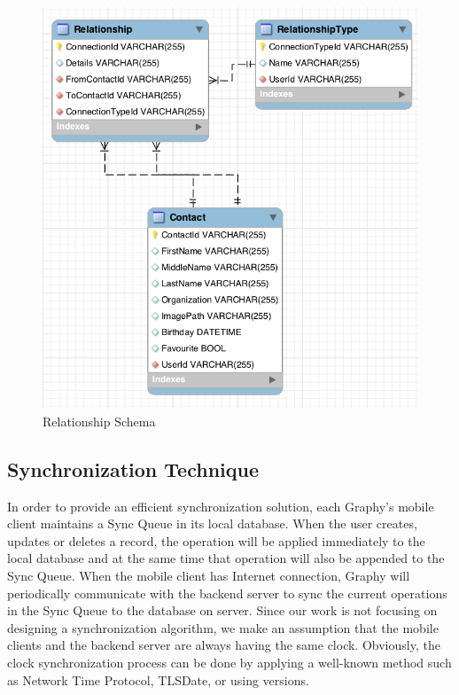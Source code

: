 \begin{figure}[!h]
\begin{centering}
\includegraphics[scale=0.5]{pics/dbrelationship}
\caption{Relationship Schema}\label{fg:dbrelationship}
\end{centering}
\end{figure}

\subsection{Synchronization Technique}
In order to provide an efficient synchronization solution, each Graphy's mobile client maintains a Sync Queue in its local database. When the user creates, updates or deletes a record, the operation will be applied immediately to the local database and at the same time that operation will also be appended to the Sync Queue. When the mobile client has Internet connection, Graphy will periodically communicate with the backend server to sync the current operations in the Sync Queue to the database on server. Since our work is not focusing on designing a synchronization algorithm, we make an assumption that the mobile clients and the backend server are always having the same clock. Obviously, the clock synchronization process can be done by applying a well-known method such as Network Time Protocol, TLSDate, or using versions.


